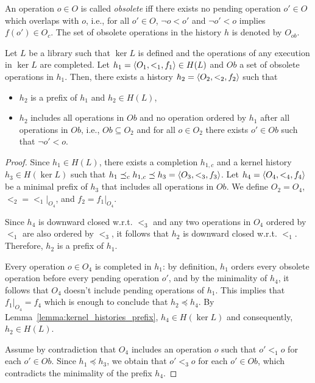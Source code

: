 An operation $o\in O$ is called \emph{obsolete} iff there exists no pending operation $o'\in O$ which 
overlaps with $o$, i.e., for all $o'\in O$, $\neg o<o'$ and $\neg o'<o$ implies
$f(o')\in O_c$. The set of obsolete operations in the history $h$ is denoted by $O_{ob}$.

\begin{lemma}\label{lemma:pref_obsolete}

Let $L$ be a library such that $\ker L$ is defined and the operations of any execution in $\ker L$ are completed.
Let $h_1=\left\langle {O_1,<_1,f_1} \right\rangle\in H(L)$ and $Ob$ a set of obsolete operations in $h_1$. Then, there exists a 
history $h_2=\left\langle {O_2,<_2,f_2} \right\rangle$ such that 

\begin{itemize}

	\item $h_2$ is a prefix of $h_1$ and $h_2\in H(L)$, 

	\item $h_2$ includes all operations in $Ob$ and no operation ordered by $h_1$ after all operations in $Ob$, i.e.,
	$Ob\subseteq O_2$ and for all $o\in O_2$ there exists $o'\in Ob$ such that $\neg o'<o$.
	
\end{itemize}

\end{lemma}

\begin{proof}

Since $h_1\in H(L)$, there exists a completion $h_{1,c}$ and a kernel history $h_3\in H(\ker L)$ such that
$h_1\preceq_c h_{1,c} \preceq h_3=\left\langle {O_3,<_3,f_3} \right\rangle$. Let $h_4=\left\langle {O_4,<_4,f_4} \right\rangle$ be a minimal prefix of $h_3$ that
includes all operations in $Ob$. We define $O_2=O_4$, $<_2=<_1 |_{O_4}$, and $f_2=f_1 |_{O_4}$.

Since $h_4$ is downward closed w.r.t. $<_3$ and any two operations in $O_4$ ordered by $<_1$ are 
also ordered by $<_3$, it follows that $h_2$ is downward closed w.r.t. $<_1$. 
Therefore, $h_2$ is a prefix of $h_1$.

Every operation $o\in O_4$ is completed in $h_1$: by definition, 
$h_1$ orders every obsolete operation before every pending operation $o'$,
and by the minimality of $h_4$, it follows that $O_4$ doesn't include pending operations
of $h_1$. This implies that $f_1 |_{O_4}=f_4$ which is enough to conclude that 
$h_2\preceq h_4$. By Lemma~\ref{lemma:kernel_histories_prefix}, $h_4\in H(\ker L)$ and consequently, 
$h_2\in H(L)$.

Assume by contradiction that $O_4$ includes an operation $o$ such that $o' <_1 o$ for each $o'\in Ob$.
Since $h_1\preceq h_3$, we obtain that $o' <_3 o$ for each $o'\in Ob$, which contradicts the minimality of
the prefix $h_4$.
\end{proof}


